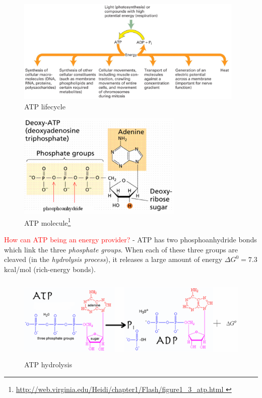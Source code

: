 \begin{figure}[hbt]
  \centerline{\includegraphics[height=5cm,
    angle=0]{./images/ATP_lifecycle.eps}}
  \caption{ATP lifecycle}
  \label{fig:ATP_cycle}
\end{figure}

\begin{figure}[hbt]
  \centerline{\includegraphics[height=5cm,
    angle=0]{./images/ATP_molecule.eps}}
  \caption{ATP molecule\footnote{\url{http://web.virginia.edu/Heidi/chapter1/Flash/figure1_3_atp.html
      }}}
  \label{fig:ATP_molecule}
\end{figure}

\textcolor{red}{How can ATP being an energy provider?}  -  ATP has two
phosphoanhydride bonds which link the three {\it phosphate groups}.
When each of these three groups are cleaved (in the
{\it hydrolysis process}), it releases a large amount of energy
$\Delta G^0=7.3$kcal/mol (rich-energy bonds).

\begin{figure}[hbt]
  \centerline{\includegraphics[height=4cm,
    angle=0]{./images/ATP_hydrolysis.eps}}
  \caption{ATP hydrolysis}
\label{fig:ATP_hydrolysis}
\end{figure}




